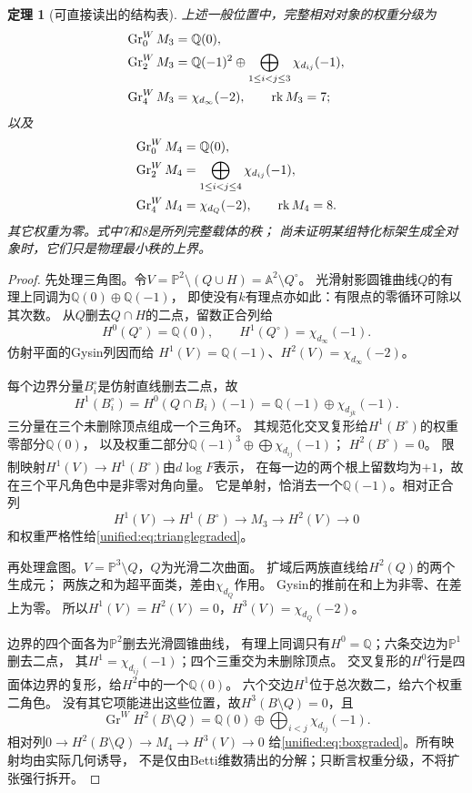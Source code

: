 \documentclass[11pt,a4paper,oneside]{ctexart}
\theoremstyle{cnplain}
\newtheorem{theorem}{定理}[section]
\theoremstyle{definition}
\theoremstyle{remark}
\newcommand{\Q}{\mathbb Q}
\numberwithin{equation}{section}
\begin{document}
\begin{theorem}[可直接读出的结构表]\label{unified:thm:onegraded}
上述一般位置中，完整相对对象的权重分级为
\begin{align}\label{unified:eq:trianglegraded}
 \operatorname{Gr}^W_0M_3&=\Q(0),\notag\\
 \operatorname{Gr}^W_2M_3&=\Q(-1)^2\oplus
                 \bigoplus_{1\le i<j\le3}\chi_{d_{ij}}(-1),\notag\\
 \operatorname{Gr}^W_4M_3&=\chi_{d_\infty}(-2),
 \qquad \rk M_3=7;
\end{align}
以及
\begin{align}\label{unified:eq:boxgraded}
 \operatorname{Gr}^W_0M_4&=\Q(0),\notag\\
 \operatorname{Gr}^W_2M_4&=\bigoplus_{1\le i<j\le4}\chi_{d_{ij}}(-1),\notag\\
 \operatorname{Gr}^W_4M_4&=\chi_{d_Q}(-2),
 \qquad \rk M_4=8.
\end{align}
其它权重为零。式中7和8是所列\emph{完整载体}的秩；
尚未证明某组特化标架生成全对象时，它们只是物理最小秩的上界。
\end{theorem}
\begin{proof}
先处理三角图。令$V=\mathbb P^2\setminus(Q\cup H)=\mathbb A^2\setminus Q^\circ$。
光滑射影圆锥曲线$Q$的有理上同调为$\Q(0)\oplus\Q(-1)$，
即使没有$k$有理点亦如此：有限点的零循环可除以其次数。
从$Q$删去$Q\cap H$的二点，留数正合列给
\[
 H^0(Q^\circ)=\Q(0),\qquad H^1(Q^\circ)=\chi_{d_\infty}(-1).
\]
仿射平面的Gysin列因而给
$H^1(V)=\Q(-1)$、$H^2(V)=\chi_{d_\infty}(-2)$。

每个边界分量$B_i^\circ$是仿射直线删去二点，故
\[
 H^1(B_i^\circ)=H^0(Q\cap B_i)(-1)
               =\Q(-1)\oplus\chi_{d_{jk}}(-1).
\]
三分量在三个未删除顶点组成一个三角环。
其规范化交叉复形给$H^1(B^\circ)$的权重零部分$\Q(0)$，
以及权重二部分$\Q(-1)^3\oplus\bigoplus\chi_{d_{ij}}(-1)$；
$H^2(B^\circ)=0$。
限制映射$H^1(V)\to H^1(B^\circ)$由$d\log F$表示，
在每一边的两个根上留数均为$+1$，故在三个平凡角色中是非零对角向量。
它是单射，恰消去一个$\Q(-1)$。相对正合列
\[
 H^1(V)\longrightarrow H^1(B^\circ)\longrightarrow M_3
            \longrightarrow H^2(V)\longrightarrow0
\]
和权重严格性给\eqref{unified:eq:trianglegraded}。

再处理盒图。$V=\mathbb P^3\setminus Q$，$Q$为光滑二次曲面。
扩域后两族直线给$H^2(Q)$的两个生成元；
两族之和为超平面类，差由$\chi_{d_Q}$作用。
Gysin的推前在和上为非零、在差上为零。
所以$H^1(V)=H^2(V)=0$，$H^3(V)=\chi_{d_Q}(-2)$。

边界的四个面各为$\mathbb P^2$删去光滑圆锥曲线，
有理上同调只有$H^0=\Q$；六条交边为$\mathbb P^1$删去二点，
其$H^1=\chi_{d_{ij}}(-1)$；四个三重交为未删除顶点。
交叉复形的$H^0$行是四面体边界的复形，给$H^2$中的一个$\Q(0)$。
六个交边$H^1$位于总次数二，给六个权重二角色。
没有其它项能进出这些位置，故$H^3(B\setminus Q)=0$，且
\[
 \operatorname{Gr}^W H^2(B\setminus Q)
   =\Q(0)\oplus\bigoplus_{i<j}\chi_{d_{ij}}(-1).
\]
相对列$0\to H^2(B\setminus Q)\to M_4\to H^3(V)\to0$
给\eqref{unified:eq:boxgraded}。所有映射均由实际几何诱导，
不是仅由Betti维数猜出的分解；只断言权重分级，不将扩张强行拆开。
\end{proof}
\end{document}
